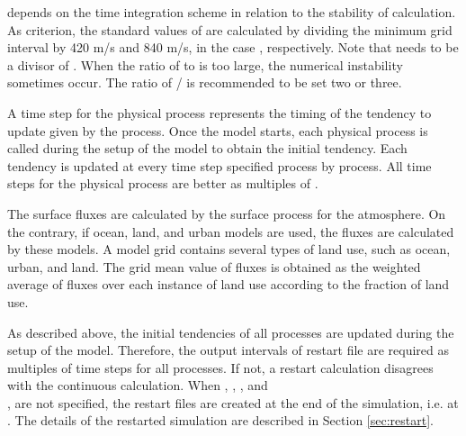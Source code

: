  depends on the time integration scheme in relation to the stability of calculation. As criterion, the standard values of  are calculated by dividing the minimum grid interval by 420 m/s and 840 m/s, in the case , respectively.
Note that  needs to be a divisor of .
When the ratio of  to  is too large,
the numerical instability sometimes occur.
The ratio of / is recommended to be set two or three.


A time step for the physical process represents the timing of the tendency to update given by the process. Once the model starts, each physical process is called during the setup of the model to obtain the initial tendency. Each tendency is updated at every time step specified process by process. All time steps for the physical process are better as multiples of .

The surface fluxes are calculated by the surface process for the atmosphere. On the contrary, if ocean, land, and urban models are used, the fluxes are calculated by these models. A model grid contains several types of land use, such as ocean, urban, and land. The grid mean value of fluxes is obtained as the weighted average of fluxes over each instance of land use according to the fraction of land use.

As described above, the initial tendencies of all processes are updated during the setup of the model. Therefore, the output intervals of restart file are required as multiples of time steps for all processes. If not, a restart calculation disagrees with the continuous calculation. When , ,  , and\\ , are not specified, the restart files are created at the end of the simulation, i.e. at . The details of the restarted simulation are described in Section \ref{sec:restart}.
